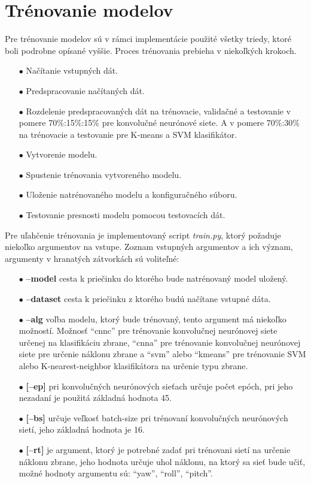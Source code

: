 
\section{Trénovanie modelov}
\label{sec:trenovanie}
Pre trénovanie modelov sú v rámci implementácie použité všetky triedy, ktoré boli podrobne opísané vyššie.
Proces trénovania prebieha v niekoľkých krokoch.
\begin{enumerate}
    \item[$\bullet$] Načítanie vstupných dát.
    \item[$\bullet$] Predspracovanie načítaných dát.
    \item[$\bullet$] Rozdelenie predspracovaných dát na trénovacie, validačné a testovanie v pomere 70\%:15\%:15\% pre konvolučné neurónové siete.
    A v pomere 70\%:30\% na trénovacie a testovanie pre K-means a SVM klasifikátor.
    \item[$\bullet$] Vytvorenie modelu.
    \item[$\bullet$] Spustenie trénovania vytvoreného modelu.
    \item[$\bullet$] Uloženie natrénovaného modelu a konfiguračného súboru.
    \item[$\bullet$] Testovanie presnosti modelu pomocou testovacích dát.
\end{enumerate}

Pre uľahčenie trénovania je implementovaný script \textit{train.py}, ktorý požaduje niekoľko argumentov na vstupe.
Zoznam vstupných argumentov a ich význam, argumenty v hranatých zátvorkách sú voliteľné:
\begin{enumerate}
  \item[$\bullet$] \textbf{--model} cesta k priečinku do ktorého bude natrénovaný model uložený.
  \item[$\bullet$] \textbf{--dataset} cesta k priečinku z ktorého budú načítane vstupné dáta.
  \item[$\bullet$] \textbf{--alg} voľba modelu, ktorý bude trénovaný, tento argument má niekoľko možností.
  Možnosť ``cnnc'' pre trénovanie konvolučnej neurónovej siete určenej na klasifikáciu zbrane,
  ``cnna'' pre trénovanie konvolučnej neurónovej siete pre určenie náklonu zbrane a
  ``svm'' alebo ``kmeans'' pre trénovanie SVM alebo K-nearest-neighbor klasifikátora na určenie typu zbrane.
  \item[$\bullet$] \textbf{[--ep]} pri konvolučných neurónových sieťach určuje počet epóch, pri jeho nezadaní je použitá
  základná hodnota 45.
  \item[$\bullet$] \textbf{[--bs]} určuje veľkosť batch-size pri trénovaní konvolučných neurónových sietí, jeho
  základná hodnota je 16.
  \item[$\bullet$] \textbf{[--rt]} je argument, ktorý je potrebné zadať pri trénovani sietí na určenie náklonu zbrane,
  jeho hodnota určuje uhol náklonu, na ktorý sa sieť bude učiť, možné hodnoty argumentu sú: ``yaw'', ``roll'', ``pitch''.
\end{enumerate}

